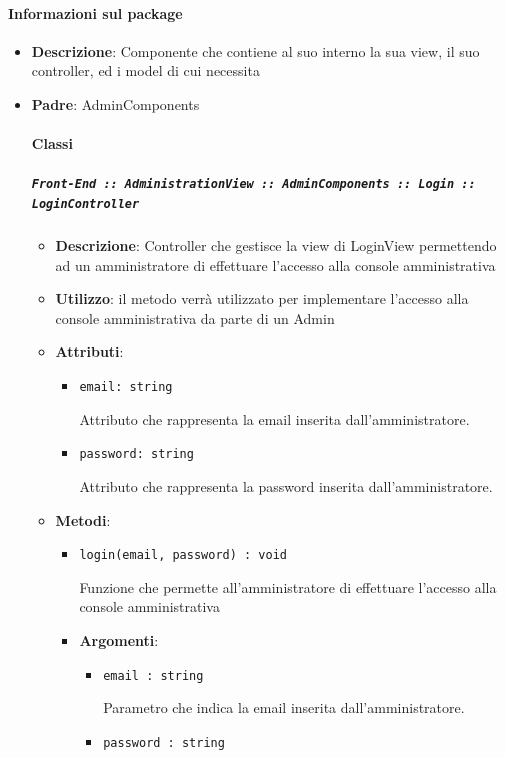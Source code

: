 \documentclass[../DefinizioneDiProdotto.tex]{subfiles}
\begin{document}
	\paragraph{Informazioni sul package}\begin{itemize}\item \textbf{Descrizione}: Componente che contiene al suo interno la sua view, il suo controller, ed i model di cui necessita\item \textbf{Padre}: AdminComponents\paragraph{Classi}
	\subparagraph{\texttt{Front-End :: AdministrationView :: AdminComponents :: Login :: LoginController}}
	\begin{itemize}\item \textbf{Descrizione}: Controller che gestisce la view di LoginView permettendo ad un amministratore di effettuare l'accesso alla console amministrativa
	\item \textbf{Utilizzo}: il metodo verrà utilizzato per implementare l'accesso alla console amministrativa da parte di un Admin
	\item \textbf{Attributi}:
	\begin{itemize}
	\item \texttt{email: string}\

	 Attributo che rappresenta la email inserita dall'amministratore.
	\end{itemize}
	\begin{itemize}
	\item \texttt{password: string}\

	 Attributo che rappresenta la password inserita dall'amministratore.
	\end{itemize}
	\item \textbf{Metodi}:
	\begin{itemize}
	\item \texttt{login(email, password) : void}\

	 Funzione che permette all'amministratore di effettuare l'accesso alla console amministrativa

	\item \textbf{Argomenti}:
	\begin{itemize}
	\item \texttt{email : string}\

	 Parametro che indica la email inserita dall'amministratore.
	\item \texttt{password : string}\


\end{itemize}
\end{itemize}
\end{itemize}
\end{itemize}
\end{document}
